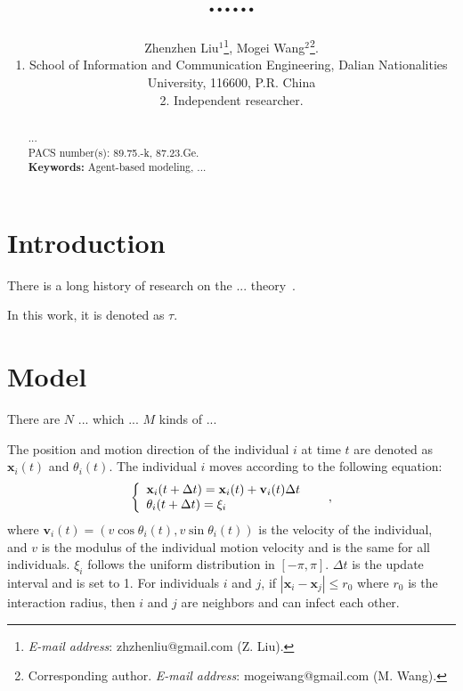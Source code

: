 \documentclass[12pt, a4paper]{article}%
\begin{document}
\newcommand{\lr}[1]{\langle #1 \rangle}
\newcommand{\llr}[1]{\langle \hspace{-2.5pt} \langle #1 \rangle \hspace{-2.5pt} \rangle}

\title{......}%
\author{
Zhenzhen Liu$^{1}$\footnote{\emph{E-mail address}: zhzhenliu@gmail.com (Z. Liu).},
Mogei Wang$^{2}$\footnote{Corresponding author. \emph{E-mail address}: mogeiwang@gmail.com (M. Wang).}.
\\{\scriptsize{1. School of Information and Communication Engineering, Dalian Nationalities University, 116600, P.R.
China}}
\vspace{-3mm} \\{\scriptsize{2. Independent researcher.}} } \date{} \maketitle \vspace{-10mm}

\begin{abstract}
...
\\[5pt]PACS number(s): 89.75.-k, 87.23.Ge.
\\[5pt]{\bf Keywords:} Agent-based modeling, ...
\end{abstract}%

\section{Introduction}%

There is a long history of research on the ... theory~\citep{Boccaletti2006, Liu2010}.

In this work, it is denoted as $\tau$.


\section{Model}%

There are $N$ ... which ... $M$ kinds of ...

The position and motion direction of the individual $i$ at time $t$ are denoted
as $\textbf{x}_i(t)$ and $\theta_i(t)$. The individual $i$ moves according to the following equation:
\begin{equation} \label{Eq:...}%
\left\{
\begin{array}{l@{\quad \quad}l}
\textbf{x}_i(t+\Delta t)=\textbf{x}_i(t)+\textbf{v}_i(t)\Delta t \\
\theta_i(t+\Delta t)=\xi_i
\end{array}
\right., \nonumber
\end{equation} %
where $\textbf{v}_i(t)= (v\cos\theta_i(t),v\sin\theta_i(t))$ is the velocity of the individual, and $v$ is the modulus
of the individual motion velocity and is the same for all individuals. $\xi_i$ follows the uniform distribution in
$[-\pi,\pi]$. $\Delta t$ is the update interval and is set to 1. For individuals $i$ and $j$, if
$\left|\textbf{x}_i-\textbf{x}_j\right|\le r_0$ where $r_0$ is the interaction radius, then $i$ and $j$ are neighbors
and can infect each other.
\end{document}
